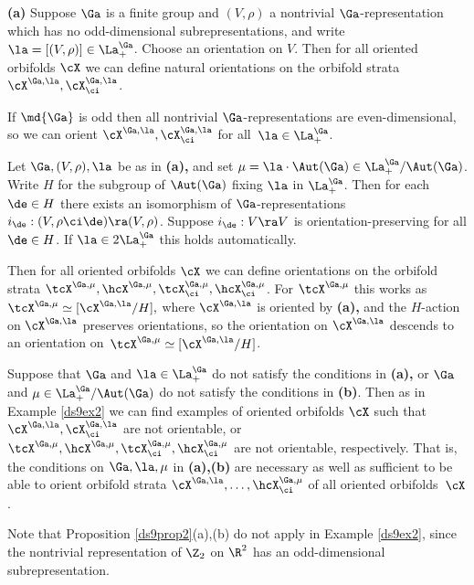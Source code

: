 \documentclass{article}
\begin{document}
\begin{prop}{\bf(a)} Suppose $\Ga$ is a finite group and\/
$(V,\rho)$ a nontrivial\/ $\Ga$-representation which has no
odd-dimensional subrepresentations, and write
$\la=[(V,\rho)]\in\La^\Ga_+$. Choose an orientation on $V$. Then for
all oriented orbifolds\/ $\cX$ we can define natural orientations on
the orbifold strata\/~$\cX^{\Ga,\la},\cX^{\Ga,\la}_\ci$.

If\/ $\md{\Ga}$ is odd then all nontrivial\/ $\Ga$-representations
are even-dimensional, so we can orient\/
$\cX^{\Ga,\la},\cX^{\Ga,\la}_\ci$ for all\/~$\la\in\La^\Ga_+$.
\smallskip

 Let\/ $\Ga,(V,\rho),\la$ be as in {\bf(a)\rm,} and
set\/ $\mu=\la\cdot\Aut(\Ga)\in\La^\Ga_+/\Aut(\Ga)$. Write $H$ for
the subgroup of\/ $\Aut(\Ga)$ fixing\/ $\la$ in\/ $\La^\Ga_+$. Then
for each\/ $\de\in H$ there exists an isomorphism of\/
$\Ga$-representations $i_\de:(V,\rho\ci\de)\ra(V,\rho)$. Suppose
$i_\de:V\ra V$ is orientation-preserving for all\/ $\de\in H$. If\/
$\la\in 2\La^\Ga_+$ this holds automatically.

Then for all oriented orbifolds\/ $\cX$ we can define orientations
on the orbifold strata\/ $\tcX^{\Ga,\mu},\hcX^{\Ga,\mu},
\tcX^{\Ga,\mu}_\ci,\hcX^{\Ga,\mu}_\ci$. For $\tcX^{\Ga,\mu}$ this
works as\/ $\tcX^{\Ga,\mu}\simeq [\cX^{\Ga,\la}/H],$ where
$\cX^{\Ga,\la}$ is oriented by {\bf(a)\rm,} and the $H$-action on
$\cX^{\Ga,\la}$ preserves orientations, so the orientation on
$\cX^{\Ga,\la}$ descends to an orientation
on\/~$\tcX^{\Ga,\mu}\simeq [\cX^{\Ga,\la}/H]$.
\smallskip

 Suppose that\/ $\Ga$ and\/ $\la\in\La^\Ga_+$ do
not satisfy the conditions in {\bf(a)\rm,} or\/ $\Ga$ and\/
$\mu\in\La^\Ga_+/\Aut(\Ga)$ do not satisfy the conditions in
{\bf(b)}. Then as in Example\/ {\rm\ref{ds9ex2}} we can find
examples of oriented orbifolds\/ $\cX$ such that\/
$\cX^{\Ga,\la},\cX^{\Ga,\la}_\ci$ are not orientable, or
$\tcX^{\Ga,\mu},\hcX^{\Ga,\mu},\tcX^{\Ga,\mu}_\ci,
\hcX^{\Ga,\mu}_\ci$ are not orientable, respectively. That is, the
conditions on $\Ga,\la,\mu$ in {\bf(a)\rm,\bf(b)} are necessary as
well as sufficient to be able to orient orbifold strata\/
$\cX^{\Ga,\la},\ldots, \hcX^{\Ga,\mu}_\ci$ of all oriented
orbifolds\/~$\cX$.
\label{ds9prop2}
\end{prop}

Note that Proposition \ref{ds9prop2}(a),(b) do not apply in Example
\ref{ds9ex2}, since the nontrivial representation of $\Z_2$ on
$\R^2$ has an odd-dimensional subrepresentation.
\end{document}
